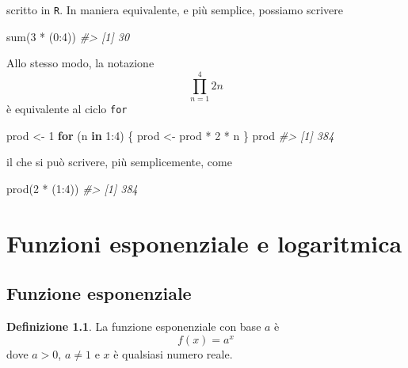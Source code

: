 \documentclass[
]{memoir}
\newenvironment{Shaded}{\begin{snugshade}}{\end{snugshade}}
\newcommand{\CommentTok}[1]{\textcolor[rgb]{0.56,0.35,0.01}{\textit{#1}}}
\newcommand{\ControlFlowTok}[1]{\textcolor[rgb]{0.13,0.29,0.53}{\textbf{#1}}}
\newcommand{\DecValTok}[1]{\textcolor[rgb]{0.00,0.00,0.81}{#1}}
\newcommand{\FunctionTok}[1]{\textcolor[rgb]{0.00,0.00,0.00}{#1}}
\newcommand{\NormalTok}[1]{#1}
\newcommand{\OtherTok}[1]{\textcolor[rgb]{0.56,0.35,0.01}{#1}}
\newcommand{\SpecialCharTok}[1]{\textcolor[rgb]{0.00,0.00,0.00}{#1}}
\theoremstyle{definition}
\newtheorem{definition}{Definizione}[chapter]
\theoremstyle{definition}
\theoremstyle{definition}
\theoremstyle{definition}
\theoremstyle{remark}
\begin{document}
scritto in \texttt{R}. In maniera equivalente, e più semplice, possiamo scrivere

\begin{Shaded}
\begin{Highlighting}[]
\FunctionTok{sum}\NormalTok{(}\DecValTok{3} \SpecialCharTok{*}\NormalTok{ (}\DecValTok{0}\SpecialCharTok{:}\DecValTok{4}\NormalTok{))}
\CommentTok{\#\textgreater{} [1] 30}
\end{Highlighting}
\end{Shaded}

Allo stesso modo, la notazione
\[
\prod_{n=1}^{4} 2n
\]
è equivalente al ciclo \texttt{for}

\begin{Shaded}
\begin{Highlighting}[]
\NormalTok{prod }\OtherTok{\textless{}{-}} \DecValTok{1}
\ControlFlowTok{for}\NormalTok{ (n }\ControlFlowTok{in} \DecValTok{1}\SpecialCharTok{:}\DecValTok{4}\NormalTok{) \{}
\NormalTok{  prod }\OtherTok{\textless{}{-}}\NormalTok{ prod }\SpecialCharTok{*} \DecValTok{2} \SpecialCharTok{*}\NormalTok{ n}
\NormalTok{\}}
\NormalTok{prod}
\CommentTok{\#\textgreater{} [1] 384}
\end{Highlighting}
\end{Shaded}

il che si può scrivere, più semplicemente, come

\begin{Shaded}
\begin{Highlighting}[]
\FunctionTok{prod}\NormalTok{(}\DecValTok{2} \SpecialCharTok{*}\NormalTok{ (}\DecValTok{1}\SpecialCharTok{:}\DecValTok{4}\NormalTok{))}
\CommentTok{\#\textgreater{} [1] 384}
\end{Highlighting}
\end{Shaded}

\hypertarget{funs-exp-log}{%
\chapter{Funzioni esponenziale e logaritmica}\label{funs-exp-log}}

\hypertarget{funzione-esponenziale}{%
\section{Funzione esponenziale}\label{funzione-esponenziale}}

\begin{definition}
La funzione esponenziale con base \(a\) è
\begin{equation}
f(x) = a^x
\end{equation}
\noindent
dove \(a > 0\), \(a \neq 1\) e \(x\) è qualsiasi numero reale.
\end{definition}
\end{document}
